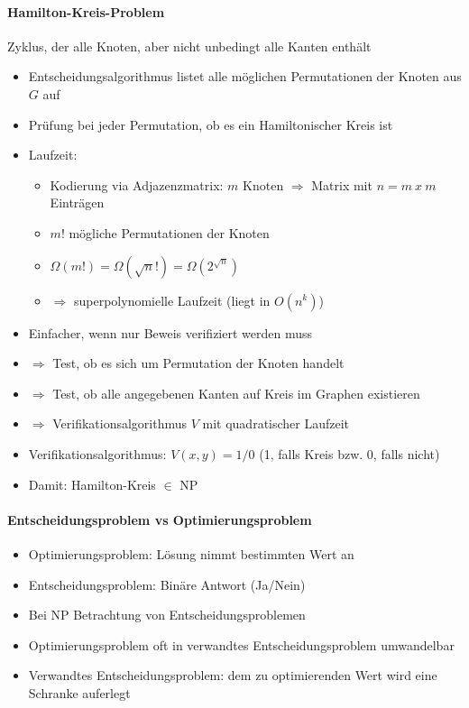 \documentclass[
    ngerman,
    color=3b,
    dark_mode,
    load_common, %
    summary,
    boxarc,
]{rubos-tuda-template}
\begin{document}
\paragraph{Hamilton-Kreis-Problem}\mbox{}
\begin{definition}\mbox{}
      Zyklus, der alle Knoten, aber nicht unbedingt alle Kanten enthält
\end{definition}
\begin{itemize}
      \item Entscheidungsalgorithmus listet alle möglichen Permutationen der Knoten aus $G$ auf
      \item Prüfung bei jeder Permutation, ob es ein Hamiltonischer Kreis ist
      \item Laufzeit:
            \begin{itemize}
                  \item Kodierung via Adjazenzmatrix: $m$ Knoten $\Rightarrow$ Matrix mit $n = m~x~m$ Einträgen
                  \item $m!$ mögliche Permutationen der Knoten
                  \item $\Omega(m!) = \Omega(\sqrt{n}!) = \Omega(2^{\sqrt{n}})$
                  \item $\Rightarrow$ superpolynomielle Laufzeit (liegt  in $O(n^k)$)
            \end{itemize}
      \item {} Einfacher, wenn nur Beweis verifiziert werden muss
      \item[] $\Rightarrow$ Test, ob es sich um Permutation der Knoten handelt
      \item[] $\Rightarrow$ Test, ob alle angegebenen Kanten auf Kreis im Graphen existieren
      \item[] $\Rightarrow$ Verifikationsalgorithmus $V$ mit quadratischer Laufzeit
      \item Verifikationsalgorithmus: $V(x,y) = 1/0$ (1, falls Kreis bzw. 0, falls nicht)
      \item Damit: Hamilton-Kreis $\in$ NP
\end{itemize}


\paragraph{Entscheidungsproblem vs Optimierungsproblem}
\begin{itemize}
      \item Optimierungsproblem: Lösung nimmt bestimmten Wert an
      \item Entscheidungsproblem: Binäre Antwort (Ja/Nein)
      \item Bei NP Betrachtung von Entscheidungsproblemen
      \item Optimierungsproblem oft in verwandtes Entscheidungsproblem umwandelbar
      \item Verwandtes Entscheidungsproblem: dem zu optimierenden Wert wird eine Schranke auferlegt
\end{itemize}
\end{document}
